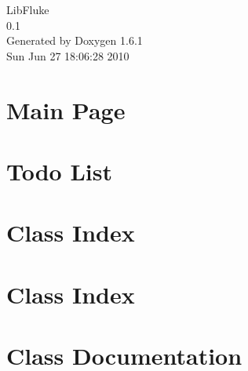 \documentclass[a4paper]{book}
\begin{document}
\hypersetup{pageanchor=false}
\begin{titlepage}
\vspace*{7cm}
\begin{center}
{\Large LibFluke \\[1ex]\large 0.1 }\\
\vspace*{1cm}
{\large Generated by Doxygen 1.6.1}\\
\vspace*{0.5cm}
{\small Sun Jun 27 18:06:28 2010}\\
\end{center}
\end{titlepage}
\clearemptydoublepage
{}
\tableofcontents
\clearemptydoublepage
{}
\hypersetup{pageanchor=true}
\chapter{Main Page}
\label{index}\hypertarget{index}{}
\chapter{Todo List}
\label{todo}
\hypertarget{todo}{}

\chapter{Class Index}

\chapter{Class Index}

\chapter{Class Documentation}














\printindex
\end{document}
